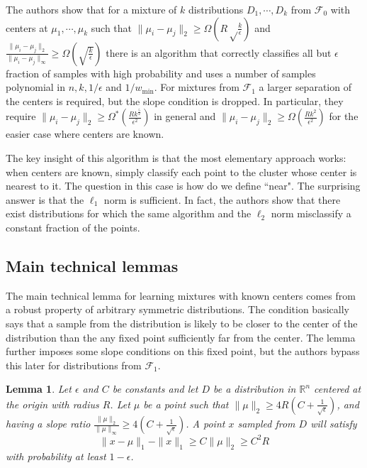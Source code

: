 \documentclass[11pt,letter]{article}
\newtheorem{lemma}{Lemma}
\begin{document}
The authors show that for a mixture of $k$ distributions $D_1, \cdots, D_k$ from $\mathcal F_0$ with centers at $\mu_1, \cdots, \mu_k$ such that $\| \mu_i - \mu_j \|_2 \geq \Omega\left(R \sqrt \frac k \epsilon \right)$ and $\frac{\|\mu_i - \mu_j\|_2}{\|\mu_i-\mu_j\|_{\infty}} \geq \Omega{\left( \sqrt{\frac{k}{\epsilon}}\right)}$ there is an algorithm that correctly classifies all but $\epsilon$ fraction of samples with high probability and uses a number of samples polynomial in $n, k, 1/\epsilon$ and $1/w_{\min}$. For mixtures from $\mathcal F_1$ a larger separation of the centers is required, but the slope condition is dropped. In particular, they require $\|\mu_i - \mu_j \|_2 \geq \Omega^* \left(\frac{Rk^{\frac{5}{2}}}{\epsilon^{2}}\right)$ in general and $\|\mu_i - \mu_j \|_2 \geq \Omega \left(\frac{Rk^{2}}{\epsilon^{2}}\right)$ for the easier case where centers are known.

The key insight of this algorithm is that the most elementary approach works: when centers are known, simply classify each point to the cluster whose center is nearest to it. The question in this case is how do we define ``near". The surprising answer is that the $\ell_1$ norm is sufficient. In fact, the authors show that there exist distributions for which the same algorithm and the $\ell_2$ norm misclassify a constant fraction of the points. 

\subsection{Main technical lemmas}

The main technical lemma for learning mixtures with known centers comes from a robust property of arbitrary symmetric distributions. The condition basically says that a sample from the distribution is likely to be closer to the center of the distribution than the any fixed point sufficiently far from the center. The lemma further imposes some slope conditions on this fixed point, but the authors bypass this later for distributions from $\mathcal F_1$. 

\begin{lemma} \label{lem:heavy-tail-lem1}
Let $\epsilon$ and $C$ be constants and let $D$ be a distribution in $\mathbb R^n$ centered at the origin with radius $R$. Let $\mu$ be a point such that $\|\mu\|_2 \geq 4R(C+\frac{1}{\sqrt{\epsilon}})$, and having a slope ratio $\frac{\|\mu\|_2}{\|\mu\|_\infty} \geq 4(C+\frac{1}{\sqrt{\epsilon}})$. A point $x$ sampled from $D$ will satisfy 
\begin{equation*}
\|x-\mu\|_1 - \|x\|_1 \geq C\|\mu\|_2 \geq C^2R 
\end{equation*}
with probability at least $1-\epsilon$. 
 
\end{lemma} 
\end{document}
